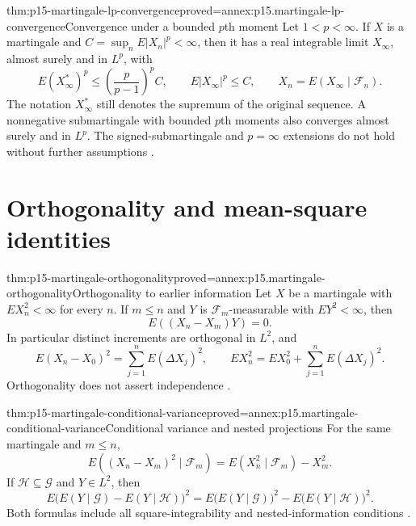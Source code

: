 \begin{hbtheorem}{thm:p15-martingale-lp-convergence}{proved=annex:p15.martingale-lp-convergence}{Convergence under a bounded \(p\)th moment}
Let \(1<p<\infty\). If \(X\) is a martingale and
\(C=\sup_nE|X_n|^p<\infty\), then it has a real integrable limit
\(X_\infty\), almost surely and in \(L^p\), with
\[
      E(X_\infty^*)^p\leq\left(\frac p{p-1}\right)^pC,\qquad
      E|X_\infty|^p\leq C,\qquad
      X_n=E(X_\infty\mid\mathcal F_n).
\]
The notation \(X_\infty^*\) still denotes the supremum of the original
sequence. A nonnegative submartingale with bounded \(p\)th moments
also converges almost surely and in \(L^p\).
The signed-submartingale and \(p=\infty\) extensions do not hold
without further assumptions \cite[thm.~4.4.6]{DurrettPTEAuthor2019}.
\end{hbtheorem}

\section{Orthogonality and mean-square identities}
\label{sec:p15-martingale-l2-identities}

\begin{hbtheorem}{thm:p15-martingale-orthogonality}{proved=annex:p15.martingale-orthogonality}{Orthogonality to earlier information}
Let \(X\) be a martingale with \(EX_n^2<\infty\) for every \(n\).
If \(m\leq n\) and \(Y\) is \(\mathcal F_m\)-measurable with
\(EY^2<\infty\), then
\[
                            E((X_n-X_m)Y)=0.
\]
In particular distinct increments are orthogonal in \(L^2\), and
\[
       E(X_n-X_0)^2=\sum_{j=1}^nE(\Delta X_j)^2,\qquad
       EX_n^2=EX_0^2+\sum_{j=1}^nE(\Delta X_j)^2.
\]
Orthogonality does not assert independence
\cite[thm.~4.4.7]{DurrettPTEAuthor2019}.
\end{hbtheorem}

\begin{hbtheorem}{thm:p15-martingale-conditional-variance}{proved=annex:p15.martingale-conditional-variance}{Conditional variance and nested projections}
For the same martingale and \(m\leq n\),
\[
             E((X_n-X_m)^2\mid\mathcal F_m)
                         =E(X_n^2\mid\mathcal F_m)-X_m^2.
\]
If \(\mathcal H\subseteq\mathcal G\) and \(Y\in L^2\), then
\[
 E\bigl(E(Y\mid\mathcal G)-E(Y\mid\mathcal H)\bigr)^2
   =E\bigl(E(Y\mid\mathcal G)\bigr)^2
                      -E\bigl(E(Y\mid\mathcal H)\bigr)^2.
\]
Both formulas include all square-integrability and nested-information
conditions \cite[thm.~4.4.8, ex.~4.4.5]{DurrettPTEAuthor2019}.
\end{hbtheorem}

